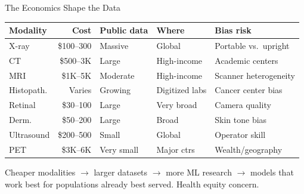 \documentclass[aspectratio=169,10pt]{beamer}
\begin{document}
\begin{frame}{The Economics Shape the Data}
\begin{center}
{\footnotesize
\renewcommand{\arraystretch}{1.15}
\begin{tabular}{p{1.8cm}rp{1.8cm}p{2cm}p{2.8cm}}
\toprule
\textbf{Modality} & \textbf{Cost} & \textbf{Public data} & \textbf{Where} & \textbf{Bias risk} \\
\midrule
X-ray & \$100--300 & Massive & Global & Portable vs.\ upright \\
CT & \$500--3K & Large & High-income & Academic centers \\
MRI & \$1K--5K & Moderate & High-income & Scanner heterogeneity \\
Histopath. & Varies & Growing & Digitized labs & Cancer center bias \\
Retinal & \$30--100 & Large & Very broad & Camera quality \\
Derm. & \$50--200 & Large & Broad & \alert{Skin tone bias} \\
Ultrasound & \$200--500 & Small & Global & Operator skill \\
PET & \$3K--6K & Very small & Major ctrs & Wealth/geography \\
\bottomrule
\end{tabular}
}
\end{center}

\vspace{0.2em}
\pause
Cheaper modalities $\to$ larger datasets $\to$ more ML research $\to$ models that work best for populations already best served. \alert{Health equity concern.}
\end{frame}
\end{document}
